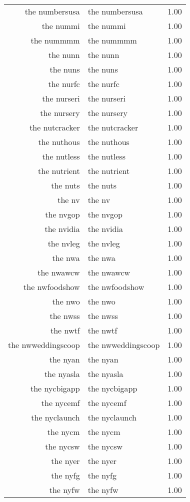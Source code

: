 \begin{table}[ht]
\begin{tabular}{rlr}
  the numbersusa & the numbersusa & 1.00 \\ 
  the nummi & the nummi & 1.00 \\ 
  the nummmm & the nummmm & 1.00 \\ 
  the nunn & the nunn & 1.00 \\ 
  the nuns & the nuns & 1.00 \\ 
  the nurfc & the nurfc & 1.00 \\ 
  the nurseri & the nurseri & 1.00 \\ 
  the nursery & the nursery & 1.00 \\ 
  the nutcracker & the nutcracker & 1.00 \\ 
  the nuthous & the nuthous & 1.00 \\ 
  the nutless & the nutless & 1.00 \\ 
  the nutrient & the nutrient & 1.00 \\ 
  the nuts & the nuts & 1.00 \\ 
  the nv & the nv & 1.00 \\ 
  the nvgop & the nvgop & 1.00 \\ 
  the nvidia & the nvidia & 1.00 \\ 
  the nvleg & the nvleg & 1.00 \\ 
  the nwa & the nwa & 1.00 \\ 
  the nwawcw & the nwawcw & 1.00 \\ 
  the nwfoodshow & the nwfoodshow & 1.00 \\ 
  the nwo & the nwo & 1.00 \\ 
  the nwss & the nwss & 1.00 \\ 
  the nwtf & the nwtf & 1.00 \\ 
  the nwweddingscoop & the nwweddingscoop & 1.00 \\ 
  the nyan & the nyan & 1.00 \\ 
  the nyasla & the nyasla & 1.00 \\ 
  the nycbigapp & the nycbigapp & 1.00 \\ 
  the nycemf & the nycemf & 1.00 \\ 
  the nyclaunch & the nyclaunch & 1.00 \\ 
  the nycm & the nycm & 1.00 \\ 
  the nycsw & the nycsw & 1.00 \\ 
  the nyer & the nyer & 1.00 \\ 
  the nyfg & the nyfg & 1.00 \\ 
  the nyfw & the nyfw & 1.00 \\ 

\end{tabular}
\end{table}
